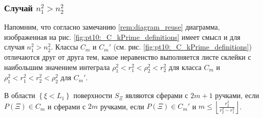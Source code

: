 \subsubsection{Случай $n_1^2 > n_2^2$}\label{s3.8.2}
Напомним, что согласно замечанию \ref{rem:diagram_reuse} диаграмма, изображенная на рис. \ref{fig:pt10:_C_kPrime_definitions} имеет смысл и для  случая $n_1^2 > n_2^2$. Классы $C_m$ и $C_m'$ (см. рис. \ref{fig:pt10:_C_kPrime_definitions}) отличаются друг от друга тем, какое неравенство выполняется листе склейки с наибольшим значением интеграла $\rho_1^2 < r_1^2 < \rho_2^2 < r_2^2$ для класса $C_m$ и $\rho_1^2 < r_1^2 < r_2^2 < \rho_2^2$ для $C_m'$.
\begin{theorem}
В области $\left\{\xi < L_1\right\}$ поверхности $S_\Xi$ являются сферами с $2m+1$ ручками, если $P(\Xi) \in C_m$ и сферами с $2m$ ручками, если $P(\Xi) \in C_m'$ и $m \leq \left\lfloor \frac{r_2^2}{r_2^2-r_1^2} \right\rfloor$. 
\label{th:pt10:th2}
\end{theorem}
